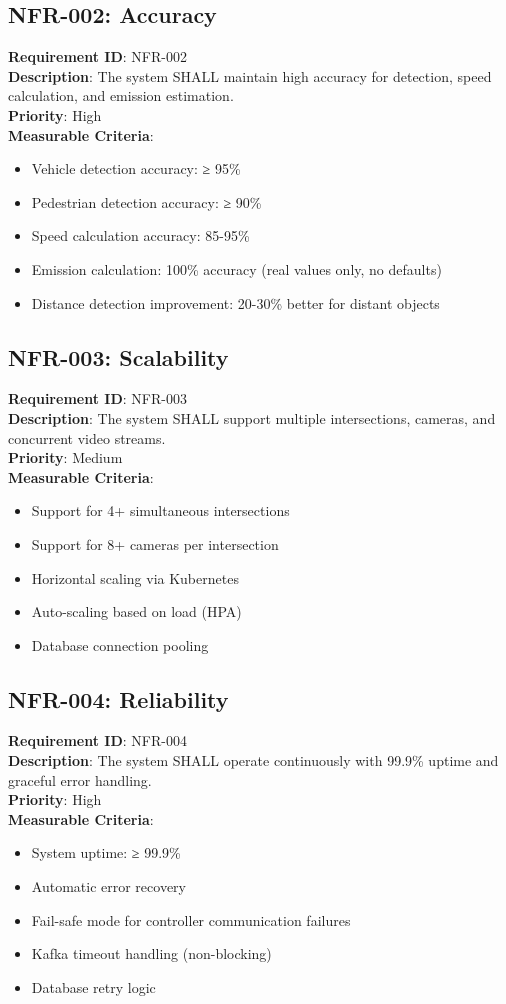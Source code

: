 \documentclass[12pt,a4paper]{article}
\begin{document}
\subsection{NFR-002: Accuracy}
\textbf{Requirement ID}: NFR-002 \\
\textbf{Description}: The system SHALL maintain high accuracy for detection, speed calculation, and emission estimation. \\
\textbf{Priority}: High \\
\textbf{Measurable Criteria}:
\begin{itemize}
    \item Vehicle detection accuracy: ≥ 95\%
    \item Pedestrian detection accuracy: ≥ 90\%
    \item Speed calculation accuracy: 85-95\%
    \item Emission calculation: 100\% accuracy (real values only, no defaults)
    \item Distance detection improvement: 20-30\% better for distant objects
\end{itemize}

\subsection{NFR-003: Scalability}
\textbf{Requirement ID}: NFR-003 \\
\textbf{Description}: The system SHALL support multiple intersections, cameras, and concurrent video streams. \\
\textbf{Priority}: Medium \\
\textbf{Measurable Criteria}:
\begin{itemize}
    \item Support for 4+ simultaneous intersections
    \item Support for 8+ cameras per intersection
    \item Horizontal scaling via Kubernetes
    \item Auto-scaling based on load (HPA)
    \item Database connection pooling
\end{itemize}

\subsection{NFR-004: Reliability}
\textbf{Requirement ID}: NFR-004 \\
\textbf{Description}: The system SHALL operate continuously with 99.9\% uptime and graceful error handling. \\
\textbf{Priority}: High \\
\textbf{Measurable Criteria}:
\begin{itemize}
    \item System uptime: ≥ 99.9\%
    \item Automatic error recovery
    \item Fail-safe mode for controller communication failures
    \item Kafka timeout handling (non-blocking)
    \item Database retry logic
\end{itemize}
\end{document}
